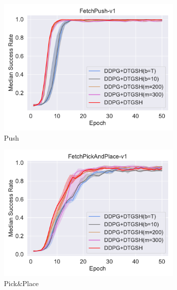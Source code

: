 \begin{figure}[t]
  \begin{subfigure}[t]{0.33\textwidth}
    \includegraphics[width=\textwidth]{figures/chapter4/FetchPush-v1_ab2.pdf}
    \caption{Push}
    \label{subfig:baseline_push_ab2}
  \end{subfigure}\hfill
  \begin{subfigure}[t]{0.33\textwidth}
    \includegraphics[width=\textwidth]{figures/chapter4/FetchPickAndPlace-v1_ab2.pdf}
    \caption{Pick\&Place}
    \label{subfig:baseline_pick_ab2}
  \end{subfigure}\hfill
  \begin{subfigure}[t]{0.33\textwidth}

\end{subfigure}
\end{figure}
